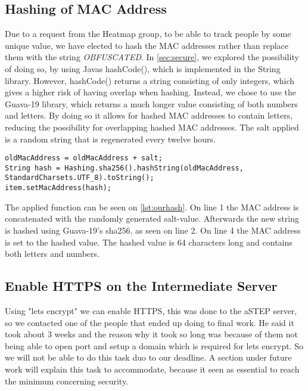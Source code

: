 \subsection*{Hashing of MAC Address}
Due to a request from the Heatmap group, to be able to track people by some unique value, we have elected to hash the MAC addresses rather than replace them with the string \emph{OBFUSCATED}. In \cref{sec:secure}, we explored the possibility of doing so, by using Javas hashCode(), which is implemented in the String library. However, hashCode() returns a string consisting of only integers, which gives a higher risk of having overlap when hashing. Instead, we chose to use the Guava-19 library, which returns a much longer value consisting of both numbers and letters. By doing so it allows for hashed MAC addresses to contain letters, reducing the possibility for overlapping hashed MAC addresses. The salt applied is a random string that is regenerated every twelve hours. 

\begin{lstlisting}[caption={Hashing a MAC address},label={lst:ourhash},language=inc_Java]
oldMacAddress = oldMacAddress + salt;
String hash = Hashing.sha256().hashString(oldMacAddress, 
StandardCharsets.UTF_8).toString();
item.setMacAddress(hash);
\end{lstlisting}

The applied function can be seen on \cref{lst:ourhash}. On line 1 the MAC address is concatenated with the randomly generated salt-value. Afterwards the new string is hashed using Guava-19's sha256, as seen on line 2. On line 4 the MAC address is set to the hashed value. The hashed value is 64 characters long and contains both letters and numbers.

\subsection*{Enable HTTPS on the Intermediate Server}
Using "lets encrypt" we can enable HTTPS, this was done to the aSTEP server, so we contacted one of the people that ended up doing to final work. He said it took about 3 weeks and the reason why it took so long was because of them not being able to open port and setup a domain which is required for lets encrypt. So we will not be able to do this task duo to our deadline. A section under future work will explain this task to accommodate, because it seen as essential to reach the minimum concerning security.
